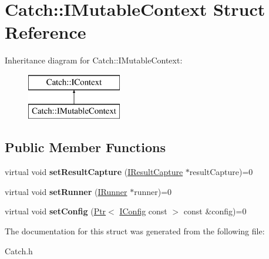 \hypertarget{struct_catch_1_1_i_mutable_context}{\section{Catch\-:\-:I\-Mutable\-Context Struct Reference}
\label{struct_catch_1_1_i_mutable_context}
}
Inheritance diagram for Catch\-:\-:I\-Mutable\-Context\-:\begin{figure}[H]
\begin{center}
\leavevmode
\includegraphics[height=2.000000cm]{struct_catch_1_1_i_mutable_context}
\end{center}
\end{figure}
\subsection*{Public Member Functions}
\begin{DoxyCompactItemize}
\item 
\hypertarget{struct_catch_1_1_i_mutable_context_a4a80afd0525b7def21bee8d9b48f2d39}{virtual void {\bfseries set\-Result\-Capture} (\hyperlink{struct_catch_1_1_i_result_capture}{I\-Result\-Capture} $\ast$result\-Capture)=0}\label{struct_catch_1_1_i_mutable_context_a4a80afd0525b7def21bee8d9b48f2d39}

\item 
\hypertarget{struct_catch_1_1_i_mutable_context_af2e53b1dea4527a2587cff266a730f6e}{virtual void {\bfseries set\-Runner} (\hyperlink{struct_catch_1_1_i_runner}{I\-Runner} $\ast$runner)=0}\label{struct_catch_1_1_i_mutable_context_af2e53b1dea4527a2587cff266a730f6e}

\item 
\hypertarget{struct_catch_1_1_i_mutable_context_a04ae4f4219a481a7bf658d9fd445bc1d}{virtual void {\bfseries set\-Config} (\hyperlink{class_catch_1_1_ptr}{Ptr}$<$ \hyperlink{struct_catch_1_1_i_config}{I\-Config} const  $>$ const \&config)=0}\label{struct_catch_1_1_i_mutable_context_a04ae4f4219a481a7bf658d9fd445bc1d}

\end{DoxyCompactItemize}


The documentation for this struct was generated from the following file\-:\begin{DoxyCompactItemize}
\item 
Catch.\-h\end{DoxyCompactItemize}
